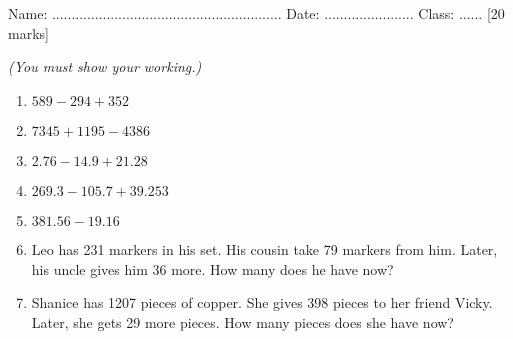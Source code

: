 \documentclass{article}
\date{}
\begin{document}
\fontsize{13}{15} \selectfont %

\begin{center}
  \qquad \\ 
\end{center} \\ 

Name: ...........................................................  \hspace{0.5cm}  Date: ....................... \hspace{0.5cm}  Class: ......\hspace{0.5cm} [20 marks]

\par
\vspace*{5pt} 
\textit{(You must show your working.)  }
\vspace{5pt}

\begin{enumerate}

\item \quad \( 589 - 294 + 352\)
\vspace{45pt}
\hline
\vspace{5pt}

\item \quad \( 7345 + 1195 - 4386\)
\vspace{80pt}
\hline
\vspace{5pt}

\item \quad \( 2.76 - 14.9 + 21.28\)
\vspace{80pt}
\hline
\vspace{5pt}

\item \quad \( 269.3 - 105.7 + 39.253\)
\vspace{75pt}
\hline
\vspace{5pt}

\item \quad \( 381.56 - 19.16 \)
\vspace{80pt}
\hline
\vspace{5pt}

\item \quad Leo has 231 markers in his set. His cousin take 79 markers from him. Later, his uncle gives him 36 more. How many does he have now?
\vspace{80pt}
\hline
\vspace{5pt}

\item \quad Shanice has 1207 pieces of copper. She gives 398 pieces to her friend Vicky. Later, she gets 29 more pieces. How many pieces does she have now?


\end{enumerate}
\end{document}

